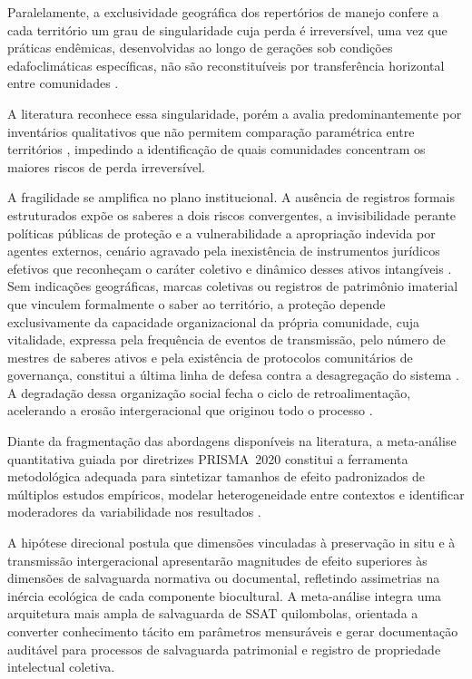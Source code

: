 Paralelamente, a exclusividade geográfica dos repertórios de manejo confere a cada território um grau de singularidade cuja perda é irreversível, uma vez que práticas endêmicas, desenvolvidas ao longo de gerações sob condições edafoclimáticas específicas, não são reconstituíveis por transferência horizontal entre comunidades \cite{Laborde2023,Ens2016}. 

A literatura reconhece essa singularidade, porém a avalia predominantemente por inventários qualitativos que não permitem comparação paramétrica entre territórios \cite{CalvetMir2016,LaRosa2021,Saiba2023}, impedindo a identificação de quais comunidades concentram os maiores riscos de perda irreversível.

A fragilidade se amplifica no plano institucional. A ausência de registros formais estruturados expõe os saberes a dois riscos convergentes, a invisibilidade perante políticas públicas de proteção e a vulnerabilidade a apropriação indevida por agentes externos, cenário agravado pela inexistência de instrumentos jurídicos efetivos que reconheçam o caráter coletivo e dinâmico desses ativos intangíveis \cite{Santilli2009}. Sem indicações geográficas, marcas coletivas ou registros de patrimônio imaterial que vinculem formalmente o saber ao território, a proteção depende exclusivamente da capacidade organizacional da própria comunidade, cuja vitalidade, expressa pela frequência de eventos de transmissão, pelo número de mestres de saberes ativos e pela existência de protocolos comunitários de governança, constitui a última linha de defesa contra a desagregação do sistema \cite{FalsBorda1991,Ostrom1990}. A degradação dessa organização social fecha o ciclo de retroalimentação, acelerando a erosão intergeracional que originou todo o processo \cite{Agrawal2002}.

Diante da fragmentação das abordagens disponíveis na literatura, a meta-análise quantitativa guiada por diretrizes PRISMA~2020 constitui a ferramenta metodológica adequada para sintetizar tamanhos de efeito padronizados de múltiplos estudos empíricos, modelar heterogeneidade entre contextos e identificar moderadores da variabilidade nos resultados \cite{Page2021,Borenstein2009,Pustejovsky2022}.

A hipótese direcional postula que dimensões vinculadas à preservação in situ e à transmissão intergeracional apresentarão magnitudes de efeito superiores às dimensões de salvaguarda normativa ou documental, refletindo assimetrias na inércia ecológica de cada componente biocultural. A meta-análise integra uma arquitetura mais ampla de salvaguarda de SSAT quilombolas, orientada a converter conhecimento tácito em parâmetros mensuráveis e gerar documentação auditável para processos de salvaguarda patrimonial e registro de propriedade intelectual coletiva.

